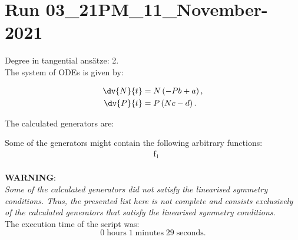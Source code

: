 \section*{Run 03\_21PM\_11\_November-2021}
Degree in tangential ansätze:	2.\\
The system of ODEs is given by:

\begin{align*}
\dv{N}{t}&=N \left(- P b + a\right),\\
\dv{P}{t}&=P \left(N c - d\right).\\
\end{align*}

\noindent The calculated generators are:



\noindent Some of the generators might contain the following arbitrary functions:
\begin{align*}
&\operatorname{f_{1}}\\
\end{align*}

\noindent\huge\textbf{WARNING}:\\
\noindent\Large\textit{Some of the calculated generators did not satisfy the linearised symmetry conditions. Thus, the presented list here is not complete and consists exclusively of the calculated generators that satisfy the linearised symmetry conditions.}\normalsize\\[2cm]
\noindent The execution time of the script was:
$$0\;\mathrm{hours}\;1\;\mathrm{minutes}\;29 \;\mathrm{seconds}.$$
